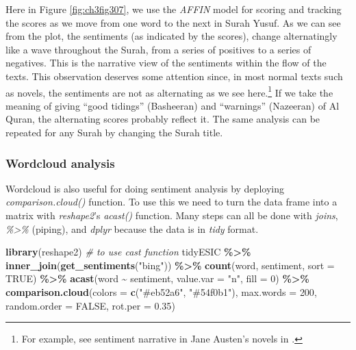 \documentclass[
]{article}
\newenvironment{Shaded}{\begin{snugshade}}{\end{snugshade}}
\newcommand{\AttributeTok}[1]{\textcolor[rgb]{0.13,0.29,0.53}{#1}}
\newcommand{\CommentTok}[1]{\textcolor[rgb]{0.56,0.35,0.01}{\textit{#1}}}
\newcommand{\ConstantTok}[1]{\textcolor[rgb]{0.56,0.35,0.01}{#1}}
\newcommand{\DecValTok}[1]{\textcolor[rgb]{0.00,0.00,0.81}{#1}}
\newcommand{\FloatTok}[1]{\textcolor[rgb]{0.00,0.00,0.81}{#1}}
\newcommand{\FunctionTok}[1]{\textcolor[rgb]{0.13,0.29,0.53}{\textbf{#1}}}
\newcommand{\NormalTok}[1]{#1}
\newcommand{\SpecialCharTok}[1]{\textcolor[rgb]{0.81,0.36,0.00}{\textbf{#1}}}
\newcommand{\StringTok}[1]{\textcolor[rgb]{0.31,0.60,0.02}{#1}}
\begin{document}
Here in Figure \ref{fig:ch3fig307}, we use the \emph{AFFIN} model for scoring and tracking the scores as we move from one word to the next in Surah Yusuf. As we can see from the plot, the sentiments (as indicated by the scores), change alternatingly like a wave throughout the Surah, from a series of positives to a series of negatives. This is the narrative view of the sentiments within the flow of the texts. This observation deserves some attention since, in most normal texts such as novels, the sentiments are not as alternating as we see here.\footnote{For example, see sentiment narrative in Jane Austen's novels in \citet{silge2017}.} If we take the meaning of giving ``good tidings'' (Basheeran) and ``warnings'' (Nazeeran) of Al Quran, the alternating scores probably reflect it. The same analysis can be repeated for any Surah by changing the Surah title.

\hypertarget{wordcloud-analysis-1}{%
\subsubsection{Wordcloud analysis}\label{wordcloud-analysis-1}}

Wordcloud is also useful for doing sentiment analysis by deploying \emph{comparison.cloud()} function. To use this we need to turn the data frame into a matrix with \emph{reshape2}'s \emph{acast()} function. Many steps can all be done with \emph{joins}, \emph{\%\textgreater\%} (piping), and \emph{dplyr} because the data is in \emph{tidy} format.

\begin{Shaded}
\begin{Highlighting}[]
\FunctionTok{library}\NormalTok{(reshape2) }\CommentTok{\# to use cast function}
\NormalTok{tidyESIC }\SpecialCharTok{\%\textgreater{}\%}
  \FunctionTok{inner\_join}\NormalTok{(}\FunctionTok{get\_sentiments}\NormalTok{(}\StringTok{"bing"}\NormalTok{)) }\SpecialCharTok{\%\textgreater{}\%}
  \FunctionTok{count}\NormalTok{(word, sentiment, }\AttributeTok{sort =} \ConstantTok{TRUE}\NormalTok{) }\SpecialCharTok{\%\textgreater{}\%}
  \FunctionTok{acast}\NormalTok{(word }\SpecialCharTok{\textasciitilde{}}\NormalTok{ sentiment, }\AttributeTok{value.var =} \StringTok{"n"}\NormalTok{, }\AttributeTok{fill =} \DecValTok{0}\NormalTok{) }\SpecialCharTok{\%\textgreater{}\%}
  \FunctionTok{comparison.cloud}\NormalTok{(}\AttributeTok{colors =} \FunctionTok{c}\NormalTok{(}\StringTok{"\#eb52a6"}\NormalTok{, }\StringTok{"\#54f0b1"}\NormalTok{),}
                   \AttributeTok{max.words =} \DecValTok{200}\NormalTok{,}
                   \AttributeTok{random.order =} \ConstantTok{FALSE}\NormalTok{,}
                   \AttributeTok{rot.per =} \FloatTok{0.35}\NormalTok{)}
\end{Highlighting}
\end{Shaded}
\end{document}
